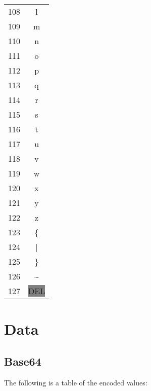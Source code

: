 \documentclass[12pt]{book}
\begin{document}
{\begin{tabular}{c c}
    108 & l \\
    109 & m \\
    110 & n \\
    111 & o \\
    112 & p \\
    113 & q \\
    114 & r \\
    115 & s \\
    116 & t \\
    117 & u \\
    118 & v \\
    119 & w \\
    120 & x \\
    121 & y \\
    122 & z \\
    123 & \{ \\
    124 & | \\
    125 & \} \\
    126 & \textasciitilde \\
    127 & \colorbox{gray}{DEL} \\
  \end{tabular}}

  \section{Data}

  \subsection{Base64}

  The following is a table of the encoded values:
\end{document}
